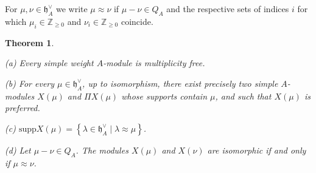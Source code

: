 \documentclass[12pt]{amsart}
\theoremstyle{plain} %
\numberwithin{equation}{section}
\theoremstyle{definition}
\theoremstyle{remark}
\theoremstyle{plain} %
\newtheorem{theorem}[definition]{Theorem}
\newcommand{\supp}{\mathrm{supp}}
\newcommand{\gh}{\mathfrak{h}}
\def\gh{\mathfrak{h}}
\begin{document}
          For $\mu, \nu \in \gh^{\vee}_A$ we write $\mu  \approx\nu$ if  $\mu - \nu \in Q_A$ and the respective sets of indices $i$ for which $\mu_i \in \mathbb Z_{\geq 0}$ and $\nu_i \in \mathbb Z_{\geq 0}$ coincide. 

        \begin{theorem}\label{thm:weightA}

          (a) Every simple weight $A$-module is multiplicity free.

          (b)  For every $\mu\in \gh^{\vee}_A$, up to isomorphism,  there exist precisely two simple $A$-modules $X(\mu)$ and $\Pi X(\mu)$ whose supports contain  $\mu$, and such that $X(\mu)$ is preferred.
          
            (c)  $ \supp X(\mu) = \left\{\lambda \in \gh_A^\vee  \; | \; \lambda \approx \mu \right\}$.
                        
          (d) Let $\mu - \nu \in Q_A$.      The modules $X(\mu)$ and $X(\nu)$ are isomorphic if and only if  $\mu  \approx \nu$.
        \end{theorem}
\end{document}
